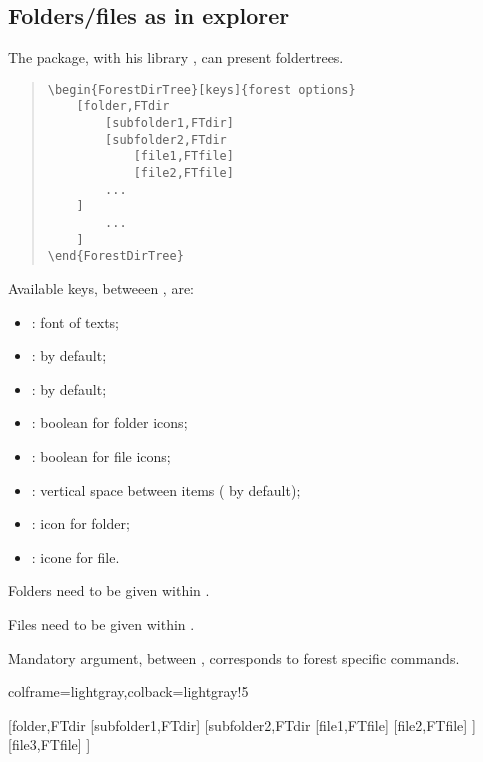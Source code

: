 \documentclass[11pt,a4paper]{ltxdoc}
\begin{document}
\pagebreak

\subsection{Folders/files as in explorer}

The  package, with his library , can present foldertrees.

\begin{quote}
\begin{verbatim}
\begin{ForestDirTree}[keys]{forest options}
    [folder,FTdir
        [subfolder1,FTdir]
        [subfolder2,FTdir
            [file1,FTfile]
            [file2,FTfile]
        ...
    ]
        ...
    ]
\end{ForestDirTree}
\end{verbatim}
\end{quote}

Available \textsf{keys}, betweeen \MontreCode{[...]}, are:

\begin{itemize}
	\item {}: font of texts;
	\item {}:  by default;
	\item {}:  by default;
	\item {}: boolean for folder icons;
	\item {}: boolean for file icons;
	\item {}: vertical space between items (\MontreCode{0.15em} by default);
	\item {}: icon for folder;
	\item {}: icone for file.
\end{itemize}

\medskip

\textsf{Folders} need to be given within .

\textsf{Files} need to be given within .

\medskip

Mandatory argument, between , corresponds to \textsf{forest} specific commands.

\begin{tcblisting}{colframe=lightgray,colback=lightgray!5}
\begin{ForestDirTree}{}
    [folder,FTdir
        [subfolder1,FTdir]
        [subfolder2,FTdir
            [file1,FTfile]
            [file2,FTfile]
        ]
        [file3,FTfile]
    ]
\end{ForestDirTree}
\end{tcblisting}
\end{document}
